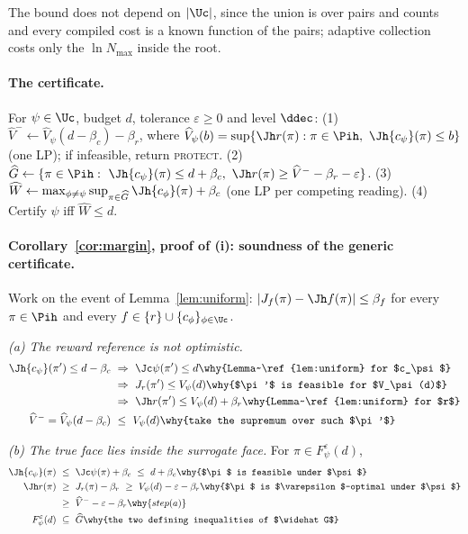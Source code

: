 \noindent The bound does not depend on $|\Uc|$, since the union is over pairs and counts
and every compiled cost is a known function of the pairs; adaptive collection costs only the
$\ln N_{\max}$ inside the root.

\paragraph{The certificate.} For $\psi\in\Uc$, budget $d$, tolerance
$\varepsilon\ge0$ and level $\ddec$:
(1) $\widehat V^-\gets\widehat V_\psi(d-\beta_c)-\beta_r$, where
$\widehat V_\psi(b)=\sup\{\Jh r(\pi):\pi\in\Pih,\ \Jh{c_\psi}(\pi)\le b\}$
(one LP); if infeasible, return \textsc{protect}.
(2) $\widehat G\gets\{\pi\in\Pih:\ \Jh{c_\psi}(\pi)\le d+\beta_c,\ \Jh r(\pi)\ge\widehat V^--\beta_r-\varepsilon\}$.
(3) $\widehat W\gets\max_{\phi\ne\psi}\sup_{\pi\in\widehat G}\Jh{c_\phi}(\pi)+\beta_c$
(one LP per competing reading).
(4) Certify $\psi$ iff $\widehat W\le d$.

\paragraph{Corollary~\ref{cor:margin}, proof of (i): soundness of the generic certificate.} Work on the event of
Lemma~\ref{lem:uniform}: $|J_f(\pi)-\Jh f(\pi)|\le\beta_f$ for every
$\pi\in\Pih$ and every $f\in\{r\}\cup\{c_\phi\}_{\phi\in\Uc}$.

\emph{(a) The reward reference is not optimistic.}
\begin{align*}
\Jh{c_\psi}(\pi')\le d-\beta_c\ &\Rightarrow\ \Jc\psi(\pi')\le d
   \why{Lemma~\ref{lem:uniform} for $c_\psi$}\\
   &\Rightarrow\ J_r(\pi')\le V_\psi(d)
   \why{$\pi'$ is feasible for $V_\psi(d)$}\\
   &\Rightarrow\ \Jh r(\pi')\le V_\psi(d)+\beta_r
   \why{Lemma~\ref{lem:uniform} for $r$}\\
\widehat V^-=\widehat V_\psi(d-\beta_c)\ &\le\ V_\psi(d)
   \why{take the supremum over such $\pi'$}
\end{align*}

\emph{(b) The true face lies inside the surrogate face.} For
$\pi\in F^\varepsilon_\psi(d)$,
\begin{align*}
\Jh{c_\psi}(\pi)\ &\le\ \Jc\psi(\pi)+\beta_c\ \le\ d+\beta_c
   \why{$\pi$ is feasible under $\psi$}\\
\Jh r(\pi)\ &\ge\ J_r(\pi)-\beta_r\ \ge\ V_\psi(d)-\varepsilon-\beta_r
   \why{$\pi$ is $\varepsilon$-optimal under $\psi$}\\
   &\ge\ \widehat V^--\varepsilon-\beta_r \why{step (a)}\\
F^\varepsilon_\psi(d)\ &\subseteq\ \widehat G
   \why{the two defining inequalities of $\widehat G$}
\end{align*}

